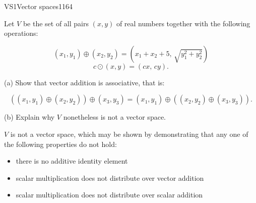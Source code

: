 \documentclass{article}
\newenvironment{exerciseStatement}{}{}
\begin{document}
\begin{exercise}{VS1}{Vector spaces}{1164} 
\begin{exerciseStatement} 

 Let \(V\) be the set of all pairs \((x,y)\) of real numbers together with the following operations: 

 \[(x_1,y_1)\oplus (x_2,y_2)=\left(x_{1} + x_{2} + 5,\,\sqrt{y_{1}^{2} + y_{2}^{2}}\right)\]\[c \odot (x,y) =\left(c x,\,c y\right).\] 

 (a) Show that vector addition is associative, that is: 

 \[
      \left((x_1,y_1)\oplus(x_2,y_2)\right)\oplus(x_3,y_3)=(x_1,y_1)\oplus\left((x_2,y_2)\oplus(x_3,y_3)\right).
    \] 

 (b) Explain why \(V\) nonetheless is not a vector space. 

 \end{exerciseStatement}
 \begin{exerciseAnswer} 

 \(V\) is not a vector space, which may be shown by demonstrating that any one of the following properties do not hold: 

 

\begin{itemize}
\item there is no additive identity element
\item scalar multiplication does not distribute over vector addition
\item scalar multiplication does not distribute over scalar addition
\end{itemize}

     \end{exerciseAnswer}
 \end{exercise}
 
\end{document}
